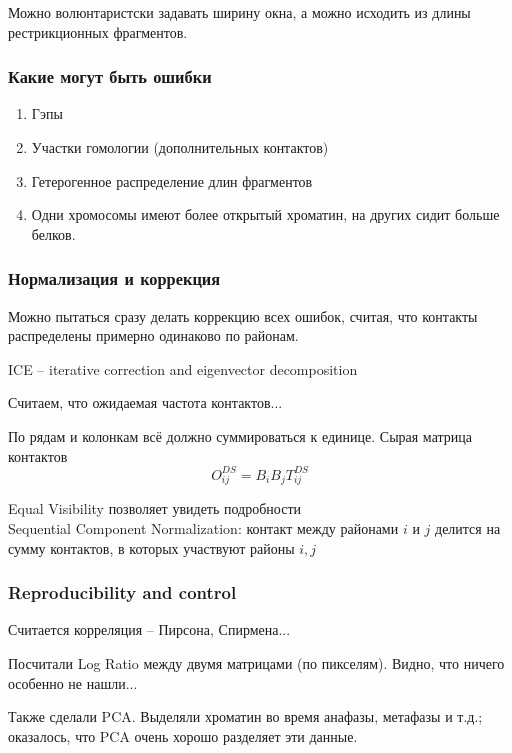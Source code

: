 \documentclass[main.tex]{subfiles}
\begin{document}
 Можно волюнтаристски задавать ширину окна, а можно исходить из длины рестрикционных фрагментов.
 
 \subsubsection{Какие могут быть ошибки}
 
 \begin{enumerate}[noitemsep]
 	\item Гэпы
 	\item Участки гомологии (дополнительных контактов)
 	\item Гетерогенное распределение длин фрагментов
 	\item Одни хромосомы имеют более открытый хроматин, на других сидит больше белков.
 \end{enumerate}

\subsubsection{Нормализация и коррекция}

Можно пытаться сразу делать коррекцию всех ошибок, считая, что контакты распределены примерно одинаково по районам.

ICE -- iterative correction and eigenvector decomposition

Считаем, что ожидаемая частота контактов... 

По рядам и колонкам всё должно суммироваться к единице.
Сырая матрица контактов
\[ O^{DS}_{ij} = B_i B_j T_{ij}^{DS} \]

Equal Visibility позволяет увидеть подробности \\ %

Sequential Component Normalization: контакт между районами $ i $ и $ j $ делится на сумму контактов, в которых участвуют районы $ i, j $

\subsubsection{Reproducibility and control}

Считается корреляция -- Пирсона, Спирмена...

Посчитали Log Ratio между двумя матрицами (по пикселям).
Видно, что ничего особенно не нашли...

Также сделали PCA.
Выделяли хроматин во время анафазы, метафазы и т.д.; оказалось, что PCA очень хорошо разделяет эти данные.
\end{document}
